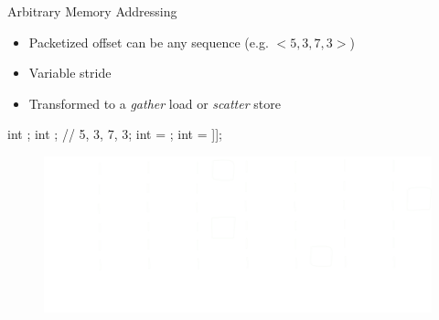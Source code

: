 \begin{frame}[fragile]{Arbitrary Memory Addressing}

\begin{itemize}
    \item Packetized offset can be any sequence (e.g. $<5, 3, 7, 3>$)
    \item Variable stride
    \item Transformed to a \emph{gather} load or \emph{scatter} store
\end{itemize}

\begin{minipage}[t]{0.40\linewidth}
    \vspace{0.1ex}
    \begin{codebox}[commandchars=\\\[\]]
    
int \uniform[*src];
int \uniform[*map]; // {5, 3, 7, 3};
int \varying[tid] = ;
int \varying[x] = \uniform[src]\idx[\uniform[map]\idx[\varying[tid]]];




    \end{codebox}
\end{minipage}
\hspace{2em}
\begin{minipage}[t]{0.49\linewidth}
    \vspace{0.6ex}
    \begin{figure}
        \includegraphics[width=1.0\textwidth]{images/arbitrary-access.pdf}
    \end{figure}
\end{minipage}

\end{frame}


